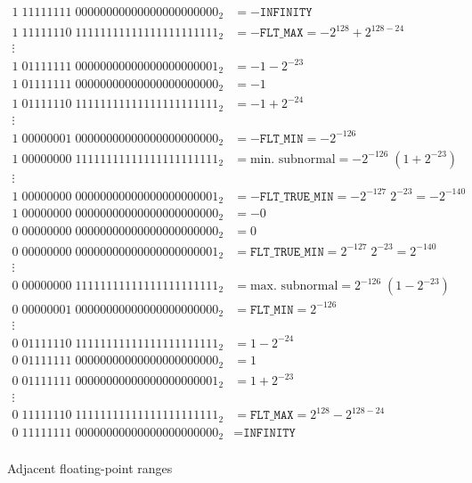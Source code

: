 \begin{figure}[p]
    \begin{align*}
        1 \; 11111111 \; 00000000000000000000000_2 &= -\texttt{INFINITY} \\
        1 \; 11111110 \; 11111111111111111111111_2 &= -\texttt{FLT\_MAX}
            = -2^{128} + 2^{128-24} \\
        \vdots \\
        1 \; 01111111 \; 00000000000000000000001_2 &= -1 - 2^{-23} \\
        1 \; 01111111 \; 00000000000000000000000_2 &= -1 \\
        1 \; 01111110 \; 11111111111111111111111_2 &= -1 + 2^{-24} \\
        \vdots \\
        1 \; 00000001 \; 00000000000000000000000_2 &= -\texttt{FLT\_MIN}
            = -2^{-126} \\
        1 \; 00000000 \; 11111111111111111111111_2 &= \text{min. subnormal}
            = -2^{-126} \; (1 + 2^{-23}) \\
        \vdots \\
        1 \; 00000000 \; 00000000000000000000001_2 &= -\texttt{FLT\_TRUE\_MIN}
            = -2^{-127} \; 2^{-23} = -2^{-140} \\
        1 \; 00000000 \; 00000000000000000000000_2 &= -0 \\
        0 \; 00000000 \; 00000000000000000000000_2 &= 0 \\
        0 \; 00000000 \; 00000000000000000000001_2 &= \texttt{FLT\_TRUE\_MIN}
            = 2^{-127} \; 2^{-23} = 2^{-140} \\
        \vdots \\
        0 \; 00000000 \; 11111111111111111111111_2 &= \text{max. subnormal}
            = 2^{-126} \; (1 - 2^{-23}) \\
        0 \; 00000001 \; 00000000000000000000000_2 &= \texttt{FLT\_MIN}
            = 2^{-126} \\
        \vdots \\
        0 \; 01111110 \; 11111111111111111111111_2 &= 1 - 2^{-24} \\
        0 \; 01111111 \; 00000000000000000000000_2 &= 1 \\
        0 \; 01111111 \; 00000000000000000000001_2 &= 1 + 2^{-23} \\
        \vdots \\
        0 \; 11111110 \; 11111111111111111111111_2 &= \texttt{FLT\_MAX}
            = 2^{128} - 2^{128-24} \\
        0 \; 11111111 \; 00000000000000000000000_2 &= \texttt{INFINITY} \\
    \end{align*}
    \caption{Adjacent floating-point ranges}
    \label{fig:arch:float_ranges}
\end{figure}

